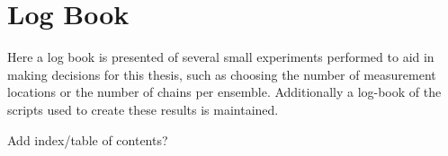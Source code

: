 \section{Log Book}\label{appendix log book}
Here a log book is presented of several small experiments performed to aid in making decisions for this thesis, such as choosing the number of measurement locations or the number of chains per ensemble. Additionally a log-book of the scripts used to create these results is maintained.

Add index/table of contents?


\clearpage

\clearpage

\clearpage

\clearpage

\clearpage

\clearpage

\clearpage

\clearpage
